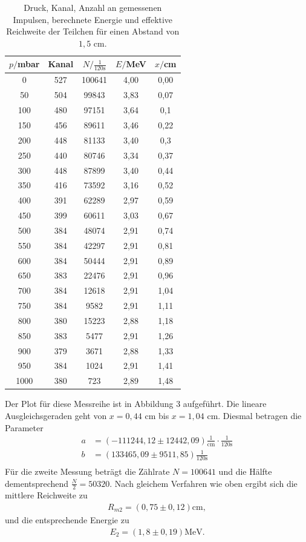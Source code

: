 \begin{table}[H]
  \centering
  \caption{Druck, Kanal, Anzahl an gemessenen Impulsen, berechnete Energie und effektive Reichweite der Teilchen für einen Abstand von $1,5$ $\si{\cm}$.}
  \label{tab:Parameter}
  \begin{tabular}{c c c c c}
    \toprule
    $p/$mbar& Kanal & $N/\frac{1}{120\si{\second}}$ & $E/$MeV & $x/$cm \\
    \bottomrule
    0 & 527 & 100641 & 4,00 & 0,00 \\
    50 & 504 & 99843 & 3,83 & 0,07 \\
    100 & 480 & 97151 & 3,64 & 0,1 \\
    150 & 456 & 89611 & 3,46 & 0,22 \\
    200 & 448 & 81133 & 3,40 & 0,3 \\
    250 & 440 & 80746 & 3,34 & 0,37 \\
    300 & 448 &87899 & 3,40 & 0,44 \\
    350 & 416 & 73592 & 3,16 & 0,52 \\
    400 & 391 & 62289 & 2,97 & 0,59 \\
    450 & 399 & 60611 & 3,03 & 0,67 \\
    500 & 384 & 48074 & 2,91 & 0,74 \\
    550 & 384 & 42297 & 2,91 & 0,81 \\
    600 & 384 & 50444 & 2,91 & 0,89 \\
    650 & 383 & 22476 & 2,91 & 0,96 \\
    700 & 384 & 12618 & 2,91 & 1,04 \\
    750 & 384 & 9582 & 2,91 & 1,11 \\
    800 & 380 & 15223 & 2,88 & 1,18 \\
    850 & 383 & 5477 & 2,91 & 1,26 \\
    900 & 379 & 3671 & 2,88 & 1,33 \\
    950 & 384 & 1024 & 2,91 & 1,41 \\
    1000 & 380 & 723 & 2,89 & 1,48 \\

     \bottomrule
  \end{tabular}
\end{table}
\noindent Der Plot für diese Messreihe ist in Abbildung 3 aufgeführt. Die lineare Ausgleichsgeraden geht von $x=0,44$ $\si{\cm}$ bis $x=1,04$ $\si{\cm}$. Diesmal betragen die Parameter
\begin{align*}
a &=  (-111244,12 \pm 12442,09) \frac{1}{\si{\centi\meter}}\cdot \frac{1}{120\si{\second}}\\
b &= (133465,09 \pm 9511,85)\frac{1}{120\si{\second}}\\
\end{align*}
Für die zweite Messung beträgt die Zählrate $N=100641$ und die Hälfte dementsprechend $\frac{N}{2}=50320$. 
Nach gleichem Verfahren wie oben ergibt sich die mittlere Reichweite zu
\begin{align*}
R_{m2} = (0,75 \pm 0,12) \si{\centi\meter}, %
\end{align*}
und die entsprechende Energie zu
\begin{align*}
E_{2} = (1,8 \pm 0,19) \si{\MeV}.
\end{align*}

